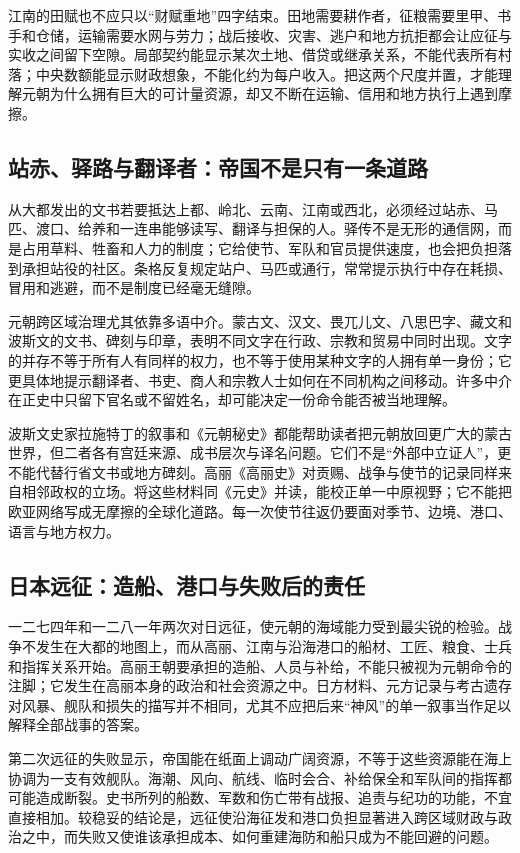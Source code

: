 江南的田赋也不应只以“财赋重地”四字结束。田地需要耕作者，征粮需要里甲、书手和仓储，运输需要水网与劳力；战后接收、灾害、逃户和地方抗拒都会让应征与实收之间留下空隙。局部契约能显示某次土地、借贷或继承关系，不能代表所有村落；中央数额能显示财政想象，不能化约为每户收入。把这两个尺度并置，才能理解元朝为什么拥有巨大的可计量资源，却又不断在运输、信用和地方执行上遇到摩擦。

\subsection{站赤、驿路与翻译者：帝国不是只有一条道路}

从大都发出的文书若要抵达上都、岭北、云南、江南或西北，必须经过站赤、马匹、渡口、给养和一连串能够读写、翻译与担保的人。驿传不是无形的通信网，而是占用草料、牲畜和人力的制度；它给使节、军队和官员提供速度，也会把负担落到承担站役的社区。条格反复规定站户、马匹或通行，常常提示执行中存在耗损、冒用和逃避，而不是制度已经毫无缝隙。

元朝跨区域治理尤其依靠多语中介。蒙古文、汉文、畏兀儿文、八思巴字、藏文和波斯文的文书、碑刻与印章，表明不同文字在行政、宗教和贸易中同时出现。文字的并存不等于所有人有同样的权力，也不等于使用某种文字的人拥有单一身份；它更具体地提示翻译者、书吏、商人和宗教人士如何在不同机构之间移动。许多中介在正史中只留下官名或不留姓名，却可能决定一份命令能否被当地理解。

波斯文史家拉施特丁的叙事和《元朝秘史》都能帮助读者把元朝放回更广大的蒙古世界，但二者各有宫廷来源、成书层次与译名问题。它们不是“外部中立证人”，更不能代替行省文书或地方碑刻。高丽《高丽史》对贡赐、战争与使节的记录同样来自相邻政权的立场。将这些材料同《元史》并读，能校正单一中原视野；它不能把欧亚网络写成无摩擦的全球化道路。每一次使节往返仍要面对季节、边境、港口、语言与地方权力。

\subsection{日本远征：造船、港口与失败后的责任}

一二七四年和一二八一年两次对日远征，使元朝的海域能力受到最尖锐的检验。战争不发生在大都的地图上，而从高丽、江南与沿海港口的船材、工匠、粮食、士兵和指挥关系开始。高丽王朝要承担的造船、人员与补给，不能只被视为元朝命令的注脚；它发生在高丽本身的政治和社会资源之中。日方材料、元方记录与考古遗存对风暴、舰队和损失的描写并不相同，尤其不应把后来“神风”的单一叙事当作足以解释全部战事的答案。

第二次远征的失败显示，帝国能在纸面上调动广阔资源，不等于这些资源能在海上协调为一支有效舰队。海潮、风向、航线、临时会合、补给保全和军队间的指挥都可能造成断裂。史书所列的船数、军数和伤亡带有战报、追责与纪功的功能，不宜直接相加。较稳妥的结论是，远征使沿海征发和港口负担显著进入跨区域财政与政治之中，而失败又使谁该承担成本、如何重建海防和船只成为不能回避的问题。

